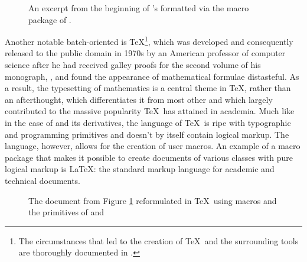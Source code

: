 \documentclass[
  a5paper,10pt,           %
  dvipsnames              %
]{book}
\begin{document}
\begin{figure}
  \caption{An excerpt from the beginning of 's
     formatted
    via the  macro package of .}
  \label{fig:poe}
\end{figure}


Another notable batch-oriented  is \TeX{}\footnote{
  The circumstances that led to the creation of \TeX\ and the surrounding tools
  are thoroughly documented in .
}, which was developed and consequently released to the public domain in 1970s
by an American professor of computer science  after he had
received galley proofs for the second volume of his monograph, , and found the appearance of mathematical formulae
distasteful. As a result, the typesetting of mathematics is a central theme in
\TeX, rather than an afterthought, which differentiates it from most other
 and which largely contributed to the massive popularity \TeX\ has
attained in academia. Much like in the case of  and its
derivatives, the language of \TeX\ is ripe with typographic and programming
primitives and doesn't by itself contain logical markup. The language, however,
allows for the creation of user macros. An example of a macro package that makes
it possible to create documents of various classes with pure logical markup is
\LaTeX{}: the standard markup language for academic and
technical documents.

\begin{figure}
  \caption{The document from Figure \ref{fig:poe} reformulated in \TeX\ using
     macros and the primitives of  and
    }
\end{figure}
\end{document}
